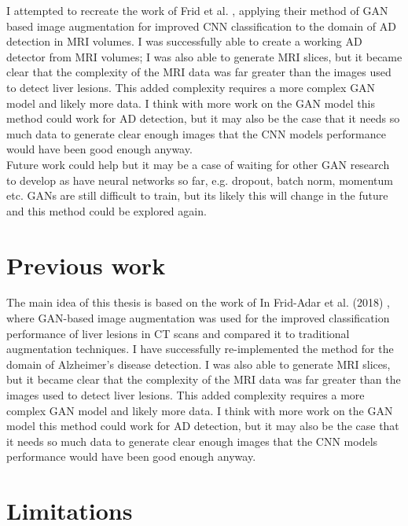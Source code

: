 \documentclass[
    author={Kai Hulme},
    supervisor={Dr Jon Bird},
    degree={BSc},
    title={Generative Adversarial Networks as an Augmentation Technique},
    subtitle={for Alzheimer's Disease Detection in MRI Volumes},
    type={Research},
    year={2021} 
]{dissertation}
\begin{document}
I attempted to recreate the work of Frid et al. \cite{frid2018gan}, applying their method of GAN based image augmentation for improved CNN classification to the domain of AD detection in MRI volumes. I was successfully able to create a working AD detector from MRI volumes; I was also able to generate MRI slices, but it became clear that the complexity of the MRI data was far greater than the images used to detect liver lesions. This added complexity requires a more complex GAN model and likely more data. I think with more work on the GAN model this method could work for AD detection, but it may also be the case that it needs so much data to generate clear enough images that the CNN models performance would have been good enough anyway. \\

Future work could help but it may be a case of waiting for other GAN research to develop as have neural networks so far, e.g. dropout, batch norm, momentum etc. GANs are still difficult to train, but its likely this will change in the future and this method could be explored again. 


				
\section{Previous work}

The main idea of this thesis is based on the work of In Frid-Adar et al. (2018) \cite{frid2018gan}, where GAN-based image augmentation was used for the improved classification performance of liver lesions in CT scans and compared it to traditional augmentation techniques. I have successfully re-implemented the method for the domain of Alzheimer's disease detection. I was also able to generate MRI slices, but it became clear that the complexity of the MRI data was far greater than the images used to detect liver lesions. This added complexity requires a more complex GAN model and likely more data. I think with more work on the GAN model this method could work for AD detection, but it may also be the case that it needs so much data to generate clear enough images that the CNN models performance would have been good enough anyway.


\section{Limitations}
\end{document}
